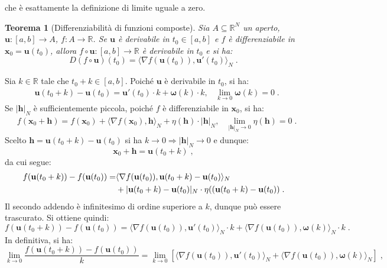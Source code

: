 \documentclass[a4paper,12pt]{report}
\theoremstyle{plain}
\newtheorem{thm}{Teorema}[section]
\theoremstyle{definition}
\theoremstyle{remark}
\numberwithin{equation}{section}
\begin{document}
che è esattamente la definizione di limite uguale a zero.
\endproof
\begin{thm}[Differenziabilità di funzioni composte] Sia $A \subseteq \mathbb{R}^N$ un aperto, $\mathbf{u}:[a,b]\to A$, $f:A \to \mathbb{R}$. Se $\mathbf{u}$ è derivabile in $t_0 \in [a,b]$ e $f$ è differenziabile in $\mathbf{x}_0=\mathbf{u}(t_0)$, allora $f \circ \mathbf{u}:[a,b] \to \mathbb{R}$ è derivabile in $t_0$ e si ha:
\begin{equation}
D(f \circ \mathbf{u})(t_0)=\langle \nabla f(\mathbf{u}(t_0)),\mathbf{u}'(t_0)\rangle_N\;.
\end{equation}
\end{thm}
\proof Sia $k \in \mathbb{R}$ tale che $t_0+k \in [a,b]$. Poiché $\mathbf{u}$ è derivabile in $t_0$, si ha:
\begin{align}
&\mathbf{u}(t_0+k)-\mathbf{u}(t_0)=\mathbf{u}'(t_0)\cdot k+\boldsymbol{\omega}(k)\cdot k, &\lim_{k\to 0}\boldsymbol{\omega}(k)=0\;.
\end{align}
Se $|\mathbf{h}|_N$ è sufficientemente piccola, poiché $f$ è differenziabile in $\mathbf{x}_0$, si ha:
\begin{align}
&f(\mathbf{x}_0+\mathbf{h})=f(\mathbf{x}_0)+\langle\nabla f(\mathbf{x}_0),\mathbf{h}\rangle_N+\eta(\mathbf{h})\cdot |\mathbf{h}|_N, &\lim_{|\mathbf{h}|_N\to 0}\eta(\mathbf{h})=0\;.
\end{align}
Scelto $\mathbf{h}=\mathbf{u}(t_0+k)-\mathbf{u}(t_0)$ si ha $k \to 0 \Longrightarrow |\mathbf{h}|_N \to 0$ e dunque:
\begin{equation}
\mathbf{x}_0+\mathbf{h}=\mathbf{u}(t_0+k)\;,
\end{equation}
da cui segue:
\begin{align}
f(\mathbf{u}(t_0+k))-f(\mathbf{u}(t_0))= &\langle\nabla f(\mathbf{u}(t_0)),\mathbf{u}(t_0+k)-\mathbf{u}(t_0)\rangle_N \notag \\
&+|\mathbf{u}(t_0+k)-\mathbf{u}(t_0)|_N\cdot\eta((\mathbf{u}(t_0+k)-\mathbf{u}(t_0))\;.
\end{align}
Il secondo addendo è infinitesimo di ordine superiore a $k$, dunque può essere trascurato. Si ottiene quindi:
\begin{equation}
f(\mathbf{u}(t_0+k))-f(\mathbf{u}(t_0)) =\langle \nabla f(\mathbf{u}(t_0)),\mathbf{u}'(t_0)\rangle_N\cdot k+\langle \nabla f(\mathbf{u}(t_0)),\boldsymbol{\omega}(k)\rangle_N\cdot k\;.
\end{equation}
In definitiva, si ha:
\begin{equation}
\lim_{k \to 0} \frac{f(\mathbf{u}(t_0+k))-f(\mathbf{u}(t_0))}{k}=\lim_{k \to 0}\left[\langle \nabla f(\mathbf{u}(t_0)),\mathbf{u}'(t_0)
\rangle_N+\langle \nabla f(\mathbf{u}(t_0)),\boldsymbol{\omega}(k)\rangle_N\right]\;,
\end{equation}
\end{document}
